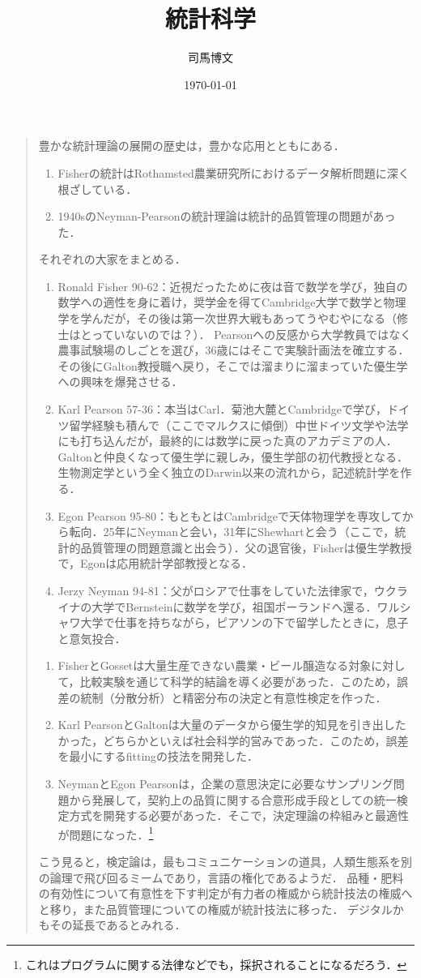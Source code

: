 \documentclass[uplatex,dvipdfmx]{jsreport}
\title{統計科学}
\author{司馬博文}
\date{\today}
\begin{document}
\tableofcontents

\begin{quotation}
    豊かな統計理論の展開の歴史は，豊かな応用とともにある．
    \begin{enumerate}
        \item Fisherの統計はRothamsted農業研究所におけるデータ解析問題に深く根ざしている．
        \item 1940sのNeyman-Pearsonの統計理論は統計的品質管理の問題があった．
    \end{enumerate}
    それぞれの大家をまとめる．
    \begin{enumerate}
        \item Ronald Fisher 90-62：近視だったために夜は音で数学を学び，独自の数学への適性を身に着け，奨学金を得てCambridge大学で数学と物理学を学んだが，その後は第一次世界大戦もあってうやむやになる（修士はとっていないのでは？）．
        Pearsonへの反感から大学教員ではなく農事試験場のしごとを選び，36歳にはそこで実験計画法を確立する．その後にGalton教授職へ戻り，そこでは溜まりに溜まっていた優生学への興味を爆発させる．
        \item Karl Pearson 57-36：本当はCarl．菊池大麓とCambridgeで学び，ドイツ留学経験も積んで（ここでマルクスに傾倒）中世ドイツ文学や法学にも打ち込んだが，最終的には数学に戻った真のアカデミアの人．Galtonと仲良くなって優生学に親しみ，優生学部の初代教授となる．生物測定学という全く独立のDarwin以来の流れから，記述統計学を作る．
        \item Egon Pearson 95-80：もともとはCambridgeで天体物理学を専攻してから転向．25年にNeymanと会い，31年にShewhartと会う（ここで，統計的品質管理の問題意識と出会う）．父の退官後，Fisherは優生学教授で，Egonは応用統計学部教授となる．
        \item Jerzy Neyman 94-81：父がロシアで仕事をしていた法律家で，ウクライナの大学でBernsteinに数学を学び，祖国ポーランドへ還る．ワルシャワ大学で仕事を持ちながら，ピアソンの下で留学したときに，息子と意気投合．
    \end{enumerate}
    \begin{enumerate}
        \item FisherとGossetは大量生産できない農業・ビール醸造なる対象に対して，比較実験を通じて科学的結論を導く必要があった．このため，誤差の統制（分散分析）と精密分布の決定と有意性検定を作った．
        \item Karl PearsonとGaltonは大量のデータから優生学的知見を引き出したかった，どちらかといえば社会科学的営みであった．このため，誤差を最小にするfittingの技法を開発した．
        \item NeymanとEgon Pearsonは，企業の意思決定に必要なサンプリング問題から発展して，契約上の品質に関する合意形成手段としての統一検定方式を開発する必要があった．そこで，決定理論の枠組みと最適性が問題になった．\footnote{これはプログラムに関する法律などでも，採択されることになるだろう．}
    \end{enumerate}
    こう見ると，検定論は，最もコミュニケーションの道具，人類生態系を別の論理で飛び回るミームであり，言語の権化であるようだ．
    品種・肥料の有効性について有意性を下す判定が有力者の権威から統計技法の権威へと移り，また品質管理についての権威が統計技法に移った．
    デジタルかもその延長であるとみれる．


\end{quotation}
\end{document}
